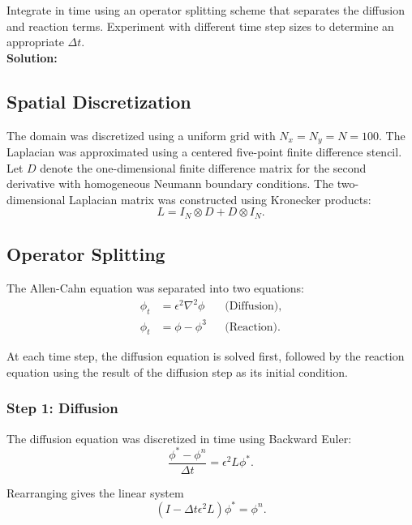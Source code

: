 \documentclass[11pt]{article}
\begin{document}
Integrate in time using an operator splitting scheme that separates the diffusion and reaction terms. Experiment with different time step sizes to determine an appropriate $\Delta t$. \\

\textbf{Solution: }

\subsection*{Spatial Discretization}

The domain was discretized using a uniform grid with $N_x=N_y=N=100$. The Laplacian was approximated using a centered five-point finite difference stencil. \\

Let $D$ denote the one-dimensional finite difference matrix for the second derivative with homogeneous Neumann boundary conditions. The two-dimensional Laplacian matrix was constructed using Kronecker products:
\[
    L=I_N\otimes D+D\otimes I_N.
\]

\subsection*{Operator Splitting}

The Allen-Cahn equation was separated into two equations:
\begin{align*}
    \phi_t &= \epsilon^2\nabla^2\phi
    &&\text{(Diffusion)},\\
    \phi_t &= \phi-\phi^3
    &&\text{(Reaction)}.
\end{align*}

At each time step, the diffusion equation is solved first, followed by the reaction equation using the result of the diffusion step as its initial condition.

\subsubsection*{Step 1: Diffusion}

The diffusion equation was discretized in time using Backward Euler:
\[
    \frac{\phi^*-\phi^n}{\Delta t}
    =\epsilon^2L\phi^*.
\]

Rearranging gives the linear system
\[
    \boxed{
        (I-\Delta t\epsilon^2L)\phi^*=\phi^n.
    }
\]
\end{document}
